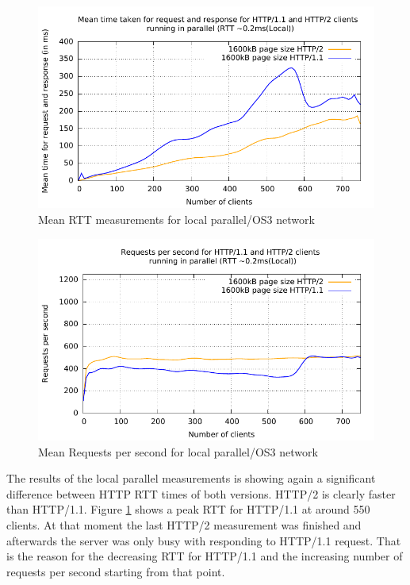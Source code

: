 \begin{figure}[H]
	\centering
	\includegraphics[scale=1,trim=0.0cm .0cm .0cm .0cm,clip]{images/latency-localv1vsv2.pdf}
	\caption{Mean RTT measurements for local parallel/OS3 network}
	\label{fig:latency-localv1vsv2}
\end{figure}

\begin{figure}[H]
	\centering
	\includegraphics[scale=1,trim=0.0cm .0cm .0cm .0cm,clip]{images/reqps-localv1vsv2.pdf}
	\caption{Mean Requests per second for local parallel/OS3 network}
	\label{fig:reqps-localv1vsv2}
\end{figure}
 
The results of the local parallel measurements is showing again a significant difference between HTTP RTT times of both versions. HTTP/2 is clearly faster than HTTP/1.1. Figure \ref{fig:latency-localv1vsv2} shows a peak RTT for HTTP/1.1 at around 550 clients. At that moment the last HTTP/2 measurement was finished and afterwards the server was only busy with responding to HTTP/1.1 request. That is the reason for the decreasing RTT for HTTP/1.1 and the increasing number of requests per second starting  from that point.

